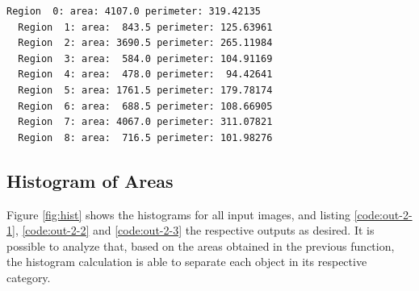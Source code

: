 \documentclass[]{IEEEtran}
\begin{document}
\begin{lstlisting}[language=sh, caption={Output for Extracted Properties for Image 2}, label={code:out-1-3}]
  Region  0: area: 4107.0 perimeter: 319.42135 
  Region  1: area:  843.5 perimeter: 125.63961 
  Region  2: area: 3690.5 perimeter: 265.11984 
  Region  3: area:  584.0 perimeter: 104.91169 
  Region  4: area:  478.0 perimeter:  94.42641 
  Region  5: area: 1761.5 perimeter: 179.78174 
  Region  6: area:  688.5 perimeter: 108.66905 
  Region  7: area: 4067.0 perimeter: 311.07821 
  Region  8: area:  716.5 perimeter: 101.98276 
\end{lstlisting}

\subsection{Histogram of Areas}
Figure \ref{fig:hist} shows the histograms for all input images, and listing \ref{code:out-2-1}, \ref{code:out-2-2} and \ref{code:out-2-3} the respective outputs as desired. It is possible to analyze that, based on the areas obtained in the previous function, the histogram calculation is able to separate each object in its respective category. 
\end{document}

